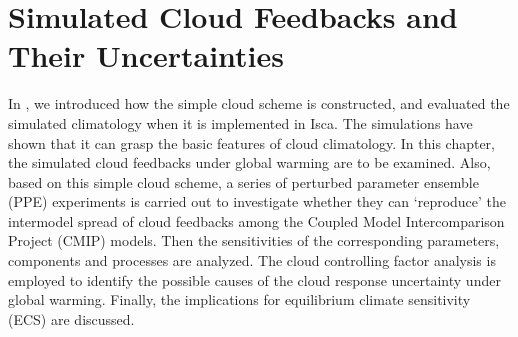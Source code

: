 \chapter{Simulated Cloud Feedbacks and Their Uncertainties}
\label{ch:cld_fbk}

In , we introduced how the simple cloud scheme is constructed, and evaluated the simulated climatology when it is implemented in Isca. The simulations have shown that it can grasp the basic features of cloud climatology. In this chapter, the simulated cloud feedbacks under global warming are to be examined. Also, based on this simple cloud scheme, a series of perturbed parameter ensemble (PPE) experiments is carried out to investigate whether they can `reproduce' the intermodel spread of cloud feedbacks among the Coupled Model Intercomparison Project (CMIP) models. Then the sensitivities of the corresponding parameters, components and processes are analyzed. The cloud controlling factor analysis is employed to identify the possible causes of the cloud response uncertainty under global warming. Finally, the implications for equilibrium climate sensitivity (ECS) are discussed.

